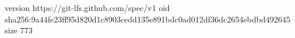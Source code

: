 version https://git-lfs.github.com/spec/v1
oid sha256:9a44fe23ff95d820d1c8903cedd135e891bdc0ad012df36dc2654ebdbd492645
size 773
